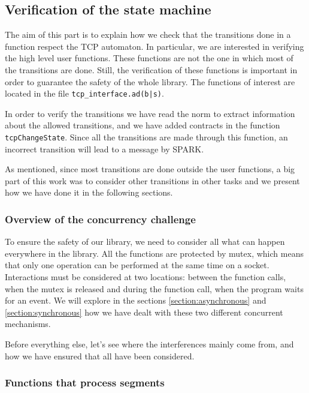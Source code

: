 \documentclass[a4paper, 10pt]{article}
\begin{document}
    \subsection{Verification of the state machine}

    The aim of this part is to explain how we check that the transitions done
    in a function respect the TCP automaton. In particular, we are interested in verifying
    the high level user functions. These functions are not the one in which most of the
    transitions are done. Still, the verification of these functions is important in order
    to guarantee the safety of the whole library. The functions of interest are located in
    the file \texttt{tcp\_interface.ad(b|s)}.

    In order to verify the transitions we have read the norm to extract information about
    the allowed transitions, and we have added contracts in the function
    \lstinline[language=Ada]{tcpChangeState}. Since all the transitions are made through
    this function, an incorrect transition will lead to a message by SPARK.

    As mentioned, since most transitions are done outside the user functions, a big part
    of this work was to consider other transitions in other tasks and we present how we have
    done it in the following sections.

    \subsubsection{Overview of the concurrency challenge}

    To ensure the safety of our library, we need to consider all what can happen everywhere in
    the library. All the functions are protected by mutex, which means that only one operation
    can be performed at the same time on a socket. Interactions must be considered at two
    locations: between the function calls, when the mutex is released and during the function
    call, when the program waits for an event. We will explore in the sections \ref{section:asynchronous}
    and \ref{section:synchronous} how we have dealt with these two different concurrent mechanisms.

    Before everything else, let's see where the interferences mainly come from, and how we have
    ensured that all have been considered.

    \subsubsection{Functions that process segments}
\end{document}
